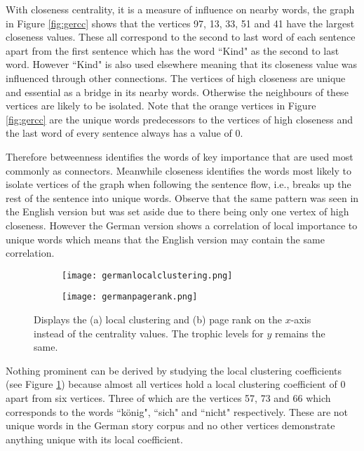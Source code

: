 With closeness centrality, it is a measure of influence on nearby words, the graph in Figure \ref{fig:gercc} shows that the vertices 97, 13, 33, 51 and 41 have the largest closeness values. These all correspond to the second to last word of each sentence apart from the first sentence which has the word ``Kind" as the second to last word. However ``Kind" is also used elsewhere meaning that its closeness value was influenced through other connections. The vertices of high closeness are unique and essential as a bridge in its nearby words. Otherwise the neighbours of these vertices are likely to be isolated. Note that the orange vertices in Figure \ref{fig:gercc} are the unique words predecessors to the vertices of high closeness and the last word of every sentence always has a value of $0$.

Therefore betweenness identifies the words of key importance that are used most commonly as connectors. Meanwhile closeness identifies the words most likely to isolate vertices of the graph when following the sentence flow, i.e., breaks up the rest of the sentence into unique words. Observe that the same pattern was seen in the English version but was set aside due to there being only one vertex of high closeness. However the German version shows a correlation of local importance to unique words which means that the English version may contain the same correlation.

\begin{figure}[!htb]
\centering
\begin{subfigure}{.45\textwidth}
	\hspace{-1cm} 
	\texttt{[image: germanlocalclustering.png]}
	\caption{}
	\label{fig:gerlc}
\end{subfigure}
\hfill
\begin{subfigure}{.45\textwidth}
	\hspace{-1cm} 
	\texttt{[image: germanpagerank.png]}
	\caption{}
	\label{fig:gerpr}
\end{subfigure}
\caption{Displays the (a) local clustering and (b) page rank on the $x$-axis instead of the centrality values. The trophic levels for $y$ remains the same.}
\label{fig:gerother}
\end{figure}

Nothing prominent can be derived by studying the local clustering coefficients (see Figure \ref{fig:gerlc}) because almost all vertices hold a local clustering coefficient of 0 apart from six vertices. Three of which are the vertices 57, 73 and 66 which corresponds to the words ``könig", ``sich" and ``nicht" respectively. These are not unique words in the German story corpus and no other vertices demonstrate anything unique with its local coefficient. 


